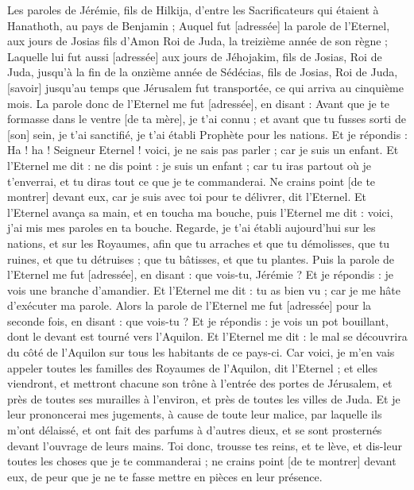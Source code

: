 \BFont
\begin{multicols}{2}
\VerseOne{}Les paroles de Jérémie, fils de Hilkija, d'entre les Sacrificateurs qui étaient à Hanathoth, au pays de Benjamin ;
Auquel fut [adressée] la parole de l'Eternel, aux jours de Josias fils d'Amon Roi de Juda, la treizième année de son règne ;
Laquelle lui fut aussi [adressée] aux jours de Jéhojakim, fils de Josias, Roi de Juda, jusqu’à la fin de la onzième année de Sédécias, fils de Josias, Roi de Juda, [savoir] jusqu’au temps que Jérusalem fut transportée, ce qui arriva au cinquième mois.
La parole donc de l'Eternel me fut [adressée], en disant :
Avant que je te formasse dans le ventre [de ta mère], je t'ai connu ; et avant que tu fusses sorti de [son] sein, je t'ai sanctifié, je t'ai établi Prophète pour les nations.
Et je répondis : Ha ! ha ! Seigneur Eternel ! voici, je ne sais pas parler ; car je suis un enfant.
Et l'Eternel me dit : ne dis point : je suis un enfant ; car tu iras partout où je t'enverrai, et tu diras tout ce que je te commanderai.
Ne crains point [de te montrer] devant eux, car je suis avec toi pour te délivrer, dit l'Eternel.
Et l'Eternel avança sa main, et en toucha ma bouche, puis l'Eternel me dit : voici, j'ai mis mes paroles en ta bouche.
Regarde, je t'ai établi aujourd'hui sur les nations, et sur les Royaumes, afin que tu arraches et que tu démolisses, que tu ruines, et que tu détruises ; que tu bâtisses, et que tu plantes.
Puis la parole de l'Eternel me fut [adressée], en disant : que vois-tu, Jérémie ? Et je répondis : je vois une branche d'amandier.
Et l'Eternel me dit : tu as bien vu ; car je me hâte d'exécuter ma parole.
Alors la parole de l'Eternel me fut [adressée] pour la seconde fois, en disant : que vois-tu ? Et je répondis : je vois un pot bouillant, dont le devant est tourné vers l'Aquilon.
Et l'Eternel me dit : le mal se découvrira du côté de l'Aquilon sur tous les habitants de ce pays-ci.
Car voici, je m'en vais appeler toutes les familles des Royaumes de l'Aquilon, dit l'Eternel ; et elles viendront, et mettront chacune son trône à l'entrée des portes de Jérusalem, et près de toutes ses murailles à l'environ, et près de toutes les villes de Juda.
Et je leur prononcerai mes jugements, à cause de toute leur malice, par laquelle ils m'ont délaissé, et ont fait des parfums à d'autres dieux, et se sont prosternés devant l'ouvrage de leurs mains.
Toi donc, trousse tes reins, et te lève, et dis-leur toutes les choses que je te commanderai ; ne crains point [de te montrer] devant eux, de peur que je ne te fasse mettre en pièces en leur présence.

\end{multicols}
